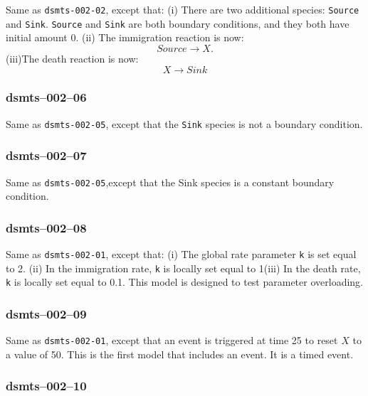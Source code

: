 Same as \verb$dsmts-002-02$, except that: (i) There are two additional
species: \verb$Source$ and \verb$Sink$. \verb$Source$ and \verb$Sink$
are both boundary conditions, and they both have initial amount
0. (ii) The immigration reaction is now: 
\[
Source \longrightarrow X. 
\]
(iii)The death reaction is now:
\[
X \longrightarrow Sink
\]


\subsubsection{dsmts--002--06} 

Same as \verb$dsmts-002-05$, except that the \verb$Sink$ species is
not a boundary condition. 


\subsubsection{dsmts--002--07} 

Same as \verb$dsmts-002-05$,except that the Sink species is a constant
boundary condition. 


\subsubsection{dsmts--002--08}

Same as \verb$dsmts-002-01$, except that: (i) The global rate
parameter \verb$k$ is set equal to 2. (ii) In the immigration rate,
\verb$k$ is locally set equal to 1(iii) In the death rate, \verb$k$ is
locally set equal to 0.1. This model is designed to test parameter
overloading. 


\subsubsection{dsmts--002--09}

Same as \verb$dsmts-002-01$, except that an event is triggered at time
25 to reset $X$ to a value of 50. This is the first model that
includes an event. It is a timed event.


\subsubsection{dsmts--002--10}

